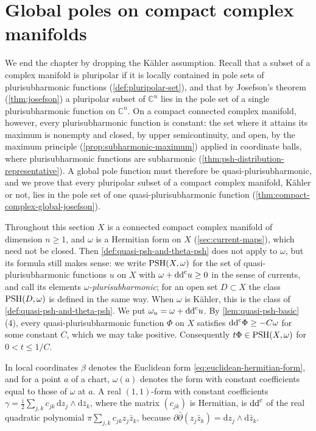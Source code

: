 \section{Global poles on compact complex manifolds}
\label{sec:compact-complex-josefson}
We end the chapter by dropping the K\"ahler assumption. Recall that a subset of a complex manifold is pluripolar if it is locally contained in pole sets of plurisubharmonic functions (\cref{def:pluripolar-set}), and that by Josefson's theorem (\cref{thm:josefson}) a pluripolar subset of $\mathbb C^n$ lies in the pole set of a single plurisubharmonic function on $\mathbb C^n$. On a compact connected complex manifold, however, every plurisubharmonic function is constant: the set where it attains its maximum is nonempty and closed, by upper semicontinuity, and open, by the maximum principle (\cref{prop:subharmonic-maximum}) applied in coordinate balls, where plurisubharmonic functions are subharmonic (\cref{thm:psh-distribution-representative}). A global pole function must therefore be quasi-plurisubharmonic, and we prove that every pluripolar subset of a compact complex manifold, K\"ahler or not, lies in the pole set of one quasi-plurisubharmonic function (\cref{thm:compact-complex-global-josefson}).

Throughout this section $X$ is a connected compact complex manifold of dimension $n\geq1$, and $\omega$ is a Hermitian form on $X$ (\cref{sec:current-maps}), which need not be closed. Then \cref{def:quasi-psh-and-theta-psh} does not apply to $\omega$, but its formula still makes sense: we write $\mathrm{PSH}(X,\omega)$ for the set of quasi-plurisubharmonic functions $u$ on $X$ with $\omega+\mathrm{dd}^{\mathrm{c}} u\geq0$ in the sense of currents, and call its elements \emph{$\omega$-plurisubharmonic}; for an open set $D\subset X$ the class $\mathrm{PSH}(D,\omega)$ is defined in the same way. When $\omega$ is K\"ahler, this is the class of \cref{def:quasi-psh-and-theta-psh}. We put $\omega_u=\omega+\mathrm{dd}^{\mathrm{c}} u$. By \cref{lem:quasi-psh-basic}(4), every quasi-plurisubharmonic function $\Phi$ on $X$ satisfies $\mathrm{dd}^{\mathrm{c}}\Phi\geq-C\omega$ for some constant $C$, which we may take positive. Consequently $t\Phi\in\mathrm{PSH}(X,\omega)$ for $0<t\leq1/C$.

In local coordinates $\beta$ denotes the Euclidean form \eqref{eq:euclidean-hermitian-form}, and for a point $a$ of a chart, $\omega(a)$ denotes the form with constant coefficients equal to those of $\omega$ at $a$. A real $(1,1)$-form with constant coefficients $\gamma=\frac{\mathrm i}2\sum_{j,k}c_{jk}\,\mathrm dz_j\wedge\mathrm d\bar z_k$, where the matrix $(c_{jk})$ is Hermitian, is $\mathrm{dd}^{\mathrm{c}}$ of the real quadratic polynomial $\pi\sum_{j,k}c_{jk}z_j\bar z_k$, because $\partial\bar\partial(z_j\bar z_k)=\mathrm dz_j\wedge\mathrm d\bar z_k$.

